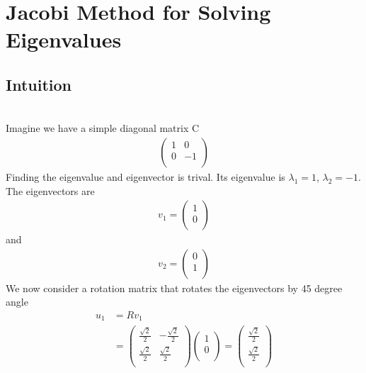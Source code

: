 \documentclass[a4paper]{article}
\begin{document}
\section{Jacobi Method for Solving Eigenvalues}
\subsection{Intuition}\\
Imagine we have a simple diagonal matrix C\\
\begin{align*}
\left( \begin{array}{cc}
1 & 0\\
0 & -1\\
\end{array} \right)
\end{align*}
Finding the eigenvalue and eigenvector is trival. Its eigenvalue is $\lambda_1 = 1$, $\lambda_2 = -1$. The eigenvectors are
\begin{align*}
	v_1 = 
	\left(  \begin{array} {c}
		1 \\
		0 \\
	\end{array} \right) 
\end{align*}
and
\begin{align*}
	v_2 = 
	\left( \begin{array} {c}
		0 \\
		1 \\
	\end{array} \right) 
\end{align*}
We now consider a rotation matrix that rotates the eigenvectors by 45 degree angle
\begin{align*}
	u_1 & = R v_1 \\
	& =\left(  \begin{array} {cc}
		\frac{\sqrt{2}}{2}& -\frac{\sqrt{2}}{2}\\
		\frac{\sqrt{2}}{2}& \frac{\sqrt{2}}{2}\\
	\end{array} \right) 
	\left(  \begin{array} {c}
		1 \\
		0 \\
	\end{array} \right) 
	=
	\left(  \begin{array} {c}
		\frac{\sqrt{2}}{2} \\
		\frac{\sqrt{2}}{2} \\
	\end{array} \right) 
\end{align*}
\end{document}
